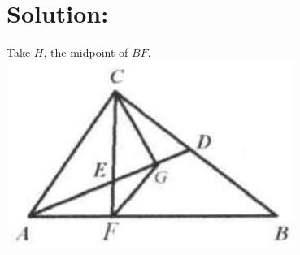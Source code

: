 \documentclass[10pt]{article}
\begin{document}
\section*{Solution:}
Take \(H\), the midpoint of \(B F\).\\
\includegraphics[max width=\textwidth, center]{2025_04_17_97bc1f7e44d93c271a88g-040(1)}
\end{document}
